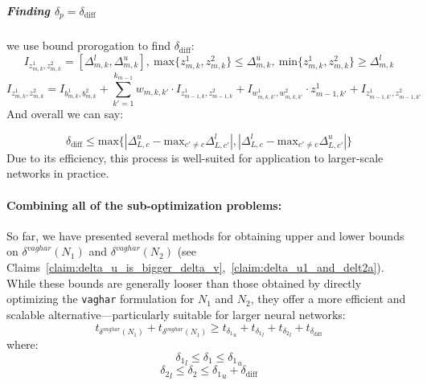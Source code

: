 \documentclass[11pt]{article}
\begin{document}
\subparagraph{Finding $\delta_p=\delta_\text{diff}$}
we use bound prorogation to find $\delta_\text{diff}$:
$$I_{z_{m,k}^1,z_{m,k}^2}=[\Delta_{m,k}^l,\Delta_{m,k}^u],\ \text{max}\{z_{m,k}^1,z_{m,k}^2\}\leq{\Delta_{m,k}^u},\ \text{min}\{z_{m,k}^1,z_{m,k}^2\}\geq{\Delta_{m,k}^l}$$
$$
I_{z_{m,k}^1,z_{m,k}^2}=I_{b_{m,k}^1,b_{m,k}^2}+\sum_{k'=1}^{k_{m-1}}{w_{m,k,k'}\cdot{I_{z_{m-1,k}^1,z_{m-1,k}^2}}+I_{w_{m,k,k'}^1,w_{m,k,k'}^2}\cdot{z_{m-1,k'}^1+I_{z_{m-1,k'}^1,z_{m-1,k'}^2}} }
$$
And overall we can say:

$$\delta_\text{diff}\leq{\text{max}\{|\Delta_{L,c}^u-\text{max}_{c'\ne{c}}{\Delta_{L,c'}^l}|,|\Delta_{L,c}^l-\text{max}_{c'\ne{c}}{\Delta_{L,c'}^u}|\}}$$
Due to its efficiency, this process is well-suited for application to larger-scale networks in practice.   

 
 \paragraph{Combining all of the sub-optimization problems:}
So far, we have presented several methods for obtaining upper and lower bounds on $\delta^{vaghar}(N_1)$ and $\delta^{vaghar}(N_2)$ (see Claims~\ref{claim:delta_u_is_bigger_delta_v},~\ref{claim:delta_u1_and_delt2a}). While these bounds are generally looser than those obtained by directly optimizing the \texttt{vaghar} formulation for $N_1$ and $N_2$, they offer a more efficient and scalable alternative—particularly suitable for larger neural networks:
  $$ t_{\delta^{vaghar}(N_1)} + t_{\delta^{vaghar}(N_1)} \geq t_{{\delta_1}_u} + t_{{\delta_1}_l} + t_{{\delta_2}_l} + t_{\delta_{\text{diff}}}$$
 where:
 $$ {{\delta_1}_l} \leq \delta_1 \leq {{\delta_1}_u} $$
  $$ {{\delta_2}_l} \leq \delta_2 \leq {{\delta_1}_u}+{\delta_{\text{diff}}} $$
 
\end{document}
